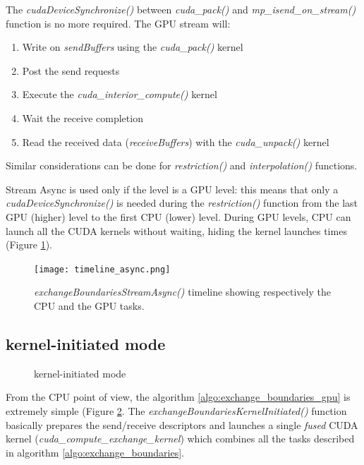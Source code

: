 \documentclass[conference]{IEEEtran}
\begin{document}
The \textit{cudaDeviceSynchronize()} between \textit{cuda\_pack()} and \textit{mp\_isend\_on\_stream()} function is no more required. The GPU stream will:

\begin{enumerate}
\item Write on \textit{sendBuffers} using the \textit{cuda\_pack()} kernel
\item Post the send requests
\item Execute the \textit{cuda\_interior\_compute()} kernel
\item Wait the receive completion
\item Read the received data (\textit{receiveBuffers}) with the \textit{cuda\_unpack()} kernel
\end{enumerate}

Similar considerations can be done for \textit{restriction()} and \textit{interpolation()} functions.

Stream Async is used only if the level is a GPU level: this means that only a \textit{cudaDeviceSynchronize()} is needed during the \textit{restriction()} function from the last GPU (higher) level to the first CPU (lower) level. During GPU levels, CPU can launch all the CUDA kernels without waiting, hiding the kernel launches times (Figure \ref{fig:timeline_async}).

\begin{figure}[h]
\centering
\texttt{[image: timeline\_async.png]}
\caption{\textit{exchangeBoundariesStreamAsync()} timeline showing respectively the CPU and the GPU tasks.}
\label{fig:timeline_async}
\end{figure}



\subsection{kernel-initiated mode}

\begin{figure}
\hfil
{}
\caption{kernel-initiated mode}
\label{fig:gpu_initited}
\end{figure}

From the CPU point of view, the algorithm \ref{algo:exchange_boundaries_gpu}
is extremely simple (Figure \ref{fig:gpu_initited}.
% 
The \textit{exchangeBoundariesKernelInitiated()} function basically
prepares the send/receive descriptors and launches a single \textit{fused}
CUDA kernel (\textit{cuda\_compute\_exchange\_kernel}) which combines all
the tasks described in algorithm \ref{algo:exchange_boundaries}.
\end{document}
